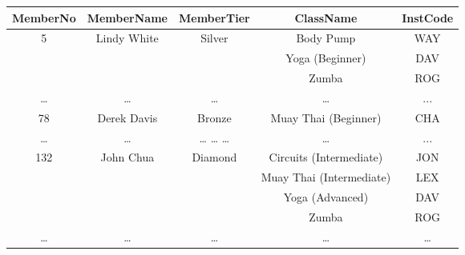\begin{tabular}{|c|c|c|c|c|}
\hline 
MemberNo  & MemberName  & MemberTier  & ClassName & InstCode\tabularnewline
\hline 
\multirow{3}{*}{5 } & \multirow{3}{*}{Lindy White} & \multirow{3}{*}{Silver } & Body Pump  & WAY \tabularnewline
\cline{4-5} \cline{5-5} 
 &  &  & Yoga (Beginner)  & DAV \tabularnewline
\cline{4-5} \cline{5-5} 
 &  &  & Zumba & ROG\tabularnewline
\hline 
\dots{}  & \dots{}  & \dots{}  & \dots{}  & ...\tabularnewline
\hline 
78  & Derek Davis  & Bronze  & Muay Thai (Beginner)  & CHA \tabularnewline
\hline 
\dots{} & \dots{}  & \dots{} \dots{} \dots{}  & \dots{}  & ...\tabularnewline
\hline 
\multirow{4}{*}{132} & \multirow{4}{*}{John Chua } & \multirow{4}{*}{Diamond } & Circuits (Intermediate)  & JON \tabularnewline
\cline{4-5} \cline{5-5} 
 &  &  & Muay Thai (Intermediate)  & LEX \tabularnewline
\cline{4-5} \cline{5-5} 
 &  &  & Yoga (Advanced) & DAV \tabularnewline
\cline{4-5} \cline{5-5} 
 &  &  & Zumba & ROG\tabularnewline
\hline 
\dots{}  & \dots{} & \dots{}  & \dots{}  & \dots{}\tabularnewline
\hline 
\end{tabular}
